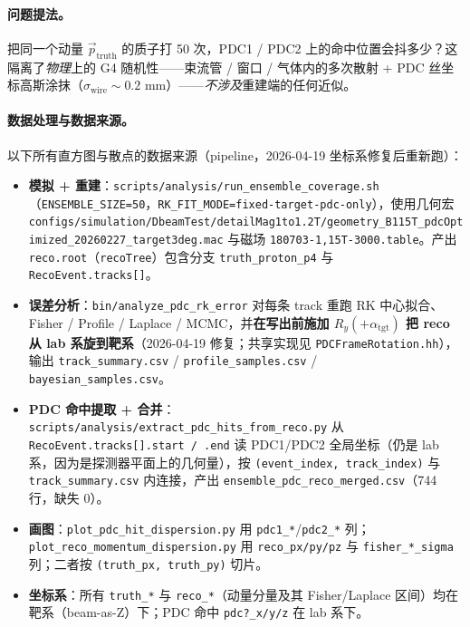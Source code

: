 \documentclass[a4paper, 11pt]{article}
\begin{document}
\paragraph{问题提法。}
把同一个动量 $\vec p_\mathrm{truth}$ 的质子打 50 次，PDC1 / PDC2 上的命中位置会抖多少？这隔离了\emph{物理}上的 G4 随机性——束流管 / 窗口 / 气体内的多次散射 + PDC 丝坐标高斯涂抹（$\sigma_\mathrm{wire} \sim 0.2$ mm）——\emph{不涉及}重建端的任何近似。

\paragraph{数据处理与数据来源。}
以下所有直方图与散点的数据来源（pipeline，2026-04-19 坐标系修复后重新跑）：

\begin{itemize}[nosep]
  \item \textbf{模拟 + 重建}：\texttt{scripts/analysis/run\_ensemble\_coverage.sh}（\texttt{ENSEMBLE\_SIZE=50}，\texttt{RK\_FIT\_MODE=fixed-target-pdc-only}），使用几何宏 \texttt{configs/simulation/DbeamTest/detailMag1to1.2T/geometry\_B115T\_pdcOptimized\_20260227\_target3deg.mac} 与磁场 \texttt{180703-1,15T-3000.table}。产出 \texttt{reco.root}（\texttt{recoTree}）包含分支 \texttt{truth\_proton\_p4} 与 \texttt{RecoEvent.tracks[]}。
  \item \textbf{误差分析}：\texttt{bin/analyze\_pdc\_rk\_error} 对每条 track 重跑 RK 中心拟合、Fisher / Profile / Laplace / MCMC，并\textbf{在写出前施加 $R_y(+\alpha_\mathrm{tgt})$ 把 reco 从 lab 系旋到靶系}（2026-04-19 修复；共享实现见 \texttt{PDCFrameRotation.hh}），输出 \texttt{track\_summary.csv} / \texttt{profile\_samples.csv} / \texttt{bayesian\_samples.csv}。
  \item \textbf{PDC 命中提取 + 合并}：\texttt{scripts/analysis/extract\_pdc\_hits\_from\_reco.py} 从 \texttt{RecoEvent.tracks[].start / .end} 读 PDC1/PDC2 全局坐标（仍是 lab 系，因为是探测器平面上的几何量），按 \texttt{(event\_index, track\_index)} 与 \texttt{track\_summary.csv} 内连接，产出 \texttt{ensemble\_pdc\_reco\_merged.csv}（744 行，缺失 0）。
  \item \textbf{画图}：\texttt{plot\_pdc\_hit\_dispersion.py} 用 \texttt{pdc1\_*}/\texttt{pdc2\_*} 列；\texttt{plot\_reco\_momentum\_dispersion.py} 用 \texttt{reco\_px/py/pz} 与 \texttt{fisher\_*\_sigma} 列；二者按 \texttt{(truth\_px, truth\_py)} 切片。
  \item \textbf{坐标系}：所有 \texttt{truth\_*} 与 \texttt{reco\_*}（动量分量及其 Fisher/Laplace 区间）均在靶系（beam-as-Z）下；PDC 命中 \texttt{pdc?\_x/y/z} 在 lab 系下。
\end{itemize}
\end{document}
